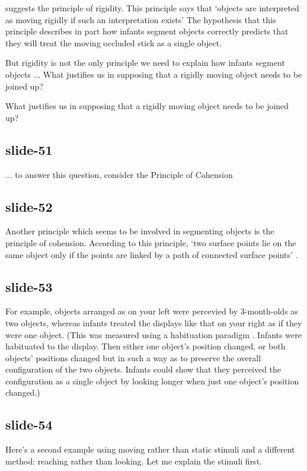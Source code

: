 \documentclass[12pt,\papersize]{extarticle}
\begin{document}
\citet{Spelke:1990jn} suggests the principle of rigidity.
This principle says that ‘objects are interpreted as moving rigidly if such an interpretation 
exists’
The hypothesis that this principle describes in part how infants segment objects correctly
predicts that they will treat the moving occluded stick as a single object.
 
But rigidity is not the only principle we need to explain how infants segment objects ...
What justifies us in supposing that a rigidly moving object needs to be joined up?
 
What justifies us in supposing that a rigidly moving object needs to be joined up?
 
\subsection{slide-51}
... to answer this question, consider the Principle of Cohension
 
\subsection{slide-52}
Another principle which seems to be involved in segmenting objects is the principle of 
cohension.
According to this principle, ‘two surface points lie on the same object only if the points are 
linked by a path of connected surface points’ \citep{Spelke:1990jn}.
 
\subsection{slide-53}
For example, objects arranged as on your left were percevied by 3-month-olds as two objects, 
whereas infants treated the displays like that on your right as if they were one object.
(This was measured using a habituation paradigm \citep{kestenbaum:1987_perception}.  Infants 
were habituated to the display.  Then either one object's position changed, or both objects' 
positions changed but in such a way as to preserve the overall configuration of the two 
objects.  Infants could show that they perceived the configuration as a single object by 
looking longer when just one object's position changed.)
 
\subsection{slide-54}
Here's a second example using moving rather than static stimuli and a different method: 
reaching rather than looking.
Let me explain the stimuli first.
 
\end{document}
